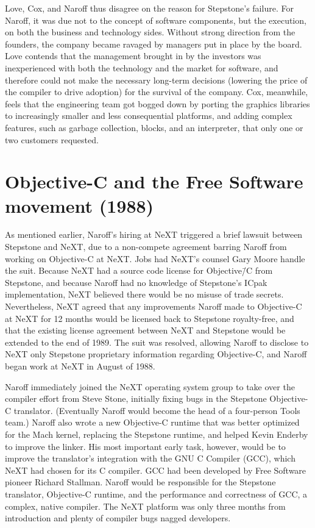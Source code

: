 \documentclass[acmsmall,screen]{acmart}
\begin{document}
Love, Cox, and Naroff thus disagree on the reason for Stepstone's failure. For Naroff, it was due not to the concept of software components, but the execution, on both the business and technology sides. Without strong direction from the founders, the company became ravaged by managers put in place by the board. Love contends that the management brought in by the investors was inexperienced with both the technology and the market for software, and therefore could not make the necessary long-term decisions (lowering the price of the compiler to drive adoption) for the survival of the company. Cox, meanwhile, feels that the engineering team got bogged down by porting the graphics libraries to increasingly smaller and less consequential platforms, and adding complex features, such as garbage collection, blocks, and an interpreter, that only one or two customers requested. 

\section{Objective-C and the Free Software movement (1988)}
\label{sec-freesoftware1988}
As mentioned earlier, Naroff's hiring at NeXT triggered a brief lawsuit between Stepstone and NeXT, due to a non-compete agreement barring Naroff from working on Objective-C at NeXT. Jobs had NeXT's counsel Gary Moore handle the suit. Because NeXT had a source code license for Objective\=/C from Stepstone, and because Naroff had no knowledge of Stepstone's ICpak implementation, NeXT believed there would be no misuse of trade secrets. Nevertheless, NeXT agreed that any improvements Naroff made to Objective-C at NeXT for 12 months would be licensed back to Stepstone royalty-free, and that the existing license agreement between NeXT and Stepstone would be extended to the end of 1989. The suit was resolved, allowing Naroff to disclose to NeXT only Stepstone proprietary information regarding Objective-C, and Naroff began work at NeXT in August of 1988. 

Naroff immediately joined the NeXT operating system group to take over the compiler effort from Steve Stone, initially fixing bugs in the Stepstone Objective-C translator. (Eventually Naroff would become the head of a four-person Tools team.) Naroff also wrote a new Objective-C runtime that was better optimized for the Mach kernel, replacing the Stepstone runtime, and helped Kevin Enderby to improve the linker. His most important early task, however, would be to improve the translator's integration with the GNU C Compiler (GCC), which NeXT had chosen for its C compiler. GCC had been developed by Free Software pioneer Richard Stallman. Naroff would be responsible for the Stepstone translator, Objective-C runtime, and the performance and correctness of GCC, a complex, native compiler. The NeXT platform was only three months from introduction and plenty of compiler bugs nagged developers.
\end{document}
